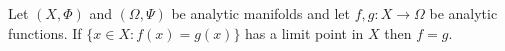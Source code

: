 Let $(X, \Phi)$ and $(\Omega, \Psi)$ be analytic manifolds and let $f, g: X \to \Omega$ be analytic functions. If $\{x \in X : f(x) = g(x)\}$ has a limit point in $X$ then $f = g$.
